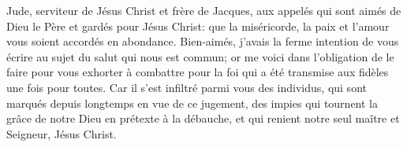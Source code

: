 Jude, serviteur de Jésus Christ et frère de Jacques,
	aux appelés qui sont aimés de Dieu le Père et gardés pour Jésus Christ:
	que la miséricorde, la paix et l’amour vous soient accordés en abondance.
Bien-aimés, j’avais la ferme intention de vous écrire
	au sujet du salut qui nous est commun;
	or me voici dans l’obligation de le faire
	pour vous exhorter à combattre pour la foi
	qui a été transmise aux fidèles une fois pour toutes.
Car il s’est infiltré parmi vous des individus,
	qui sont marqués depuis longtemps en vue de ce jugement,
	des impies qui tournent la grâce de notre Dieu en prétexte à la débauche,
	et qui renient notre seul maître et Seigneur, Jésus Christ.
